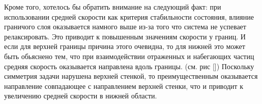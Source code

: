         Кроме того, хотелось бы обратить внимание на следующий факт: при использовании средней скорости как критерия стабильности состояния, влияние граничого слоя оказывается намного выше из-за того что система не успевает релаксировать. Это приводит к повышенным значениям скорости у границ. И если для верхней границы причина этого очевидна, то для нижней это может быть обьяснено тем, что при взаимодействии отраженных и набегающих частиц средняя скорость оказывается направлена вдоль границы. (см. рис []) Поскольку симметрия задачи нарушена верхней стенкой, то преимущественным оказывается направление совпадающее с направлением верхней стенки, что и приводит к увеличению средней скорости в нижней области.
